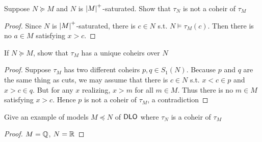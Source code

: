\documentclass[11pt]{article}
\begin{document}
\begin{exercise}
Suppose \(N\succeq M\) and \(N\) is \(\abs{M}^+\)-saturated. Show that \(\tau_N\) is not a coheir of \(\tau_M\)
\end{exercise}

\begin{proof}
Since \(N\) is \(\abs{M}^+\)-saturated, there is \(c\in N\) s.t. \(N\vDash\tau_M(c)\). Then there is
no \(a\in M\) satisfying \(x>c\).
\end{proof}

\begin{exercise}
If \(N\succeq M\), show that \(\tau_M\) has a unique coheirs over \(N\)
\end{exercise}

\begin{proof}
Suppose \(\tau_M\) has two different coheirs \(p,q\in S_1(N)\). Because \(p\) and \(q\) are the same thing
as cuts, we may assume that there is \(c\in N\) s.t. \(x<c\in p\)
and \(x>c\in q\). But for any \(x\) realizing, \(x>m\) for all \(m\in M\). Thus there is
no \(m\in M\) satisfying \(x>c\). Hence \(p\) is not a coheir of \(\tau_M\), a contradiction
\end{proof}

\begin{exercise}
Give an example of models \(M\preceq N\) of \(\operatorname{\textsf{DLO}}\) where \(\tau_N\) is a coheir of \(\tau_M\)
\end{exercise}

\begin{proof}
\(M=\mathbb{Q}\), \(N=\mathbb{R}\)
\end{proof}
\end{document}
